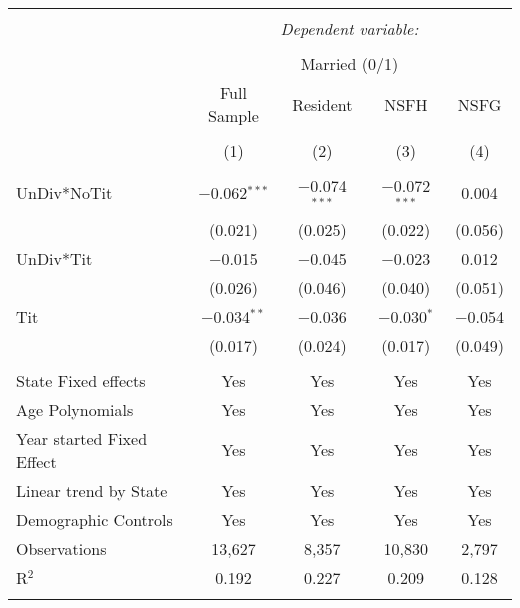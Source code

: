 
\begingroup 
\footnotesize 
\begin{tabular}{@{\extracolsep{5pt}}lcccc} 
\\[-1.8ex]\hline 
\hline \\[-1.8ex] 
 & \multicolumn{4}{c}{\textit{Dependent variable:}} \\ 
\cline{2-5} 
\\[-1.8ex] & \multicolumn{4}{c}{Married (0/1)} \\ 
 & Full Sample & Resident & NSFH & NSFG \\ 
\\[-1.8ex] & (1) & (2) & (3) & (4)\\ 
\hline \\[-1.8ex] 
 UnDiv*NoTit & $-$0.062$^{***}$ & $-$0.074$^{***}$ & $-$0.072$^{***}$ & 0.004 \\ 
  & (0.021) & (0.025) & (0.022) & (0.056) \\ 
  UnDiv*Tit & $-$0.015 & $-$0.045 & $-$0.023 & 0.012 \\ 
  & (0.026) & (0.046) & (0.040) & (0.051) \\ 
  Tit & $-$0.034$^{**}$ & $-$0.036 & $-$0.030$^{*}$ & $-$0.054 \\ 
  & (0.017) & (0.024) & (0.017) & (0.049) \\ 
 \hline \\[-1.8ex] 
State Fixed effects & Yes & Yes & Yes & Yes \\ 
Age Polynomials & Yes & Yes & Yes & Yes \\ 
Year started Fixed Effect & Yes & Yes & Yes & Yes \\ 
Linear trend by State & Yes & Yes & Yes & Yes \\ 
Demographic Controls & Yes & Yes & Yes & Yes \\ 
Observations & 13,627 & 8,357 & 10,830 & 2,797 \\ 
R$^{2}$ & 0.192 & 0.227 & 0.209 & 0.128 \\ 
\hline 
\hline \\[-1.8ex] 
\end{tabular} 
\endgroup 
